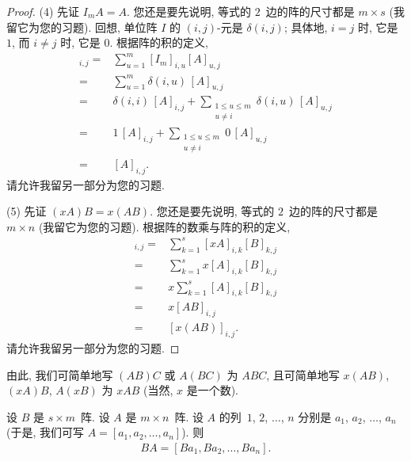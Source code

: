 \documentclass[../libro.tex]{subfiles}
\begin{document}
\begin{proof}
    (4)
    先证 \(I_m A = A\).
    您还是要先说明, 等式的 \(2\)~边的阵的尺寸都是 \(m \times s\)
    (我留它为您的习题).
    回想, 单位阵 \(I\) 的 \((i, j)\)-元是
    \(\delta(i, j)\);
    具体地, \(i = j\) 时, 它是 \(1\),
    而 \(i \neq j\) 时, 它是 \(0\).
    根据阵的积的定义,
    \begin{align*}
        [I_m A]_{i,j}
        = {} &
        \sum_{u = 1}^{m} {[I_m]_{i,u} [A]_{u,j}}
        \\
        = {} &
        \sum_{u = 1}^{m} {\delta(i, u)\, [A]_{u,j}}
        \\
        = {} &
        \delta(i, i)\, [A]_{i,j}
        + \sum_{\substack{1 \leq u \leq m \\ u \neq i}}
        {\delta(i, u)\, [A]_{u,j}}
        \\
        = {} &
        1\,[A]_{i,j}
        + \sum_{\substack{1 \leq u \leq m \\ u \neq i}}
        {0\,[A]_{u,j}}
        \\
        = {} & [A]_{i,j}.
    \end{align*}
    请允许我留另一部分为您的习题.

    (5)
    先证 \((xA)B = x(AB)\).
    您还是要先说明, 等式的 \(2\)~边的阵的尺寸都是 \(m \times n\)
    (我留它为您的习题).
    根据阵的数乘与阵的积的定义,
    \begin{align*}
        [(xA)B]_{i,j}
        = {} &
        \sum_{k = 1}^{s} {[xA]_{i,k} [B]_{k,j}}
        \\
        = {} &
        \sum_{k = 1}^{s} {x[A]_{i,k} [B]_{k,j}}
        \\
        = {} &
        x \sum_{k = 1}^{s} {[A]_{i,k} [B]_{k,j}}
        \\
        = {} &
        x [AB]_{i,j}
        \\
        = {} &
        [x(AB)]_{i,j}.
    \end{align*}
    请允许我留另一部分为您的习题.
\end{proof}

由此, 我们可简单地写 \((AB)C\) 或 \(A(BC)\) 为 \(ABC\),
且可简单地写 \(x(AB)\), \((xA)B\), \(A(xB)\)
为 \(xAB\)
(当然, \(x\) 是一个数).

\begin{theorem}
    设 \(B\) 是 \(s \times m\)~阵.
    设 \(A\) 是 \(m \times n\)~阵.
    设 \(A\) 的列~\(1\), \(2\), \(\dots\), \(n\)
    分别是 \(a_1\), \(a_2\), \(\dots\), \(a_n\)
    (于是, 我们可写 \(A = [a_1, a_2, \dots, a_n]\)).
    则
    \begin{align*}
        BA = [Ba_1, Ba_2, \dots, Ba_n].
    \end{align*}
\end{theorem}
\end{document}
